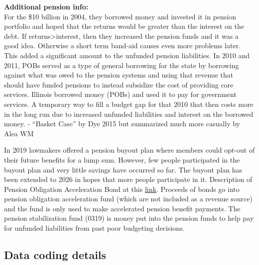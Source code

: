 \documentclass[
  letterpaper,
  DIV=11,
  numbers=noendperiod]{scrreport}
\begin{document}
\textbf{Additional pension info:}\\
For the \$10 billion in 2004, they borrowed money and invested it in
pension portfolio and hoped that the returns would be greater than the
interest on the debt. If returns\textgreater interest, then they
increased the pension funds and it was a good idea. Otherwise a short
term band-aid causes even more problems later. This added a significant
amount to the unfunded pension liabilities. In 2010 and 2011, POBs
served as a type of general borrowing for the state by borrowing against
what was owed to the pension systems and using that revenue that should
have funded pensions to instead subsidize the cost of providing core
services. Illinois borrowed money (POBs) and used it to pay for
government services. A temporary way to fill a budget gap for that 2010
that then costs more in the long run due to increased unfunded
liabilities and interest on the borrowed money. - ``Basket Case'' by Dye
2015 but summarized much more casually by Alea WM

In 2019 lawmakers offered a pension buyout plan where members could
opt-out of their future benefits for a lump sum. However, few people
participated in the buyout plan and very little savings have occurred so
far. The buyout plan has been extended to 2026 in hopes that more people
participate in it. Description of Pension Obligation Acceleration Bond
at this
\href{https://www.ilga.gov/legislation/ilcs/documents/003003300K7.7.htm}{link}.
Proceeds of bonds go into pension obligation acceleration fund (which
are not included as a revenue source) and the fund is only used to make
accelerated pension benefit payments. The pension stabilization fund
(0319) is money put into the pension funds to help pay for unfunded
liabilities from past poor budgeting decisions.

\hypertarget{data-coding-details}{%
\subsection{\texorpdfstring{\textbf{Data coding
details}}{Data coding details}}\label{data-coding-details}}
\end{document}
